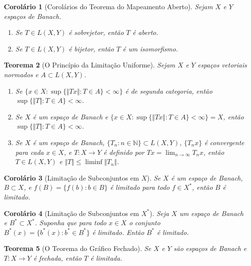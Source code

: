 \documentclass[12pt]{article}
\newtheorem{theorem}{Teorema}[section]
\newtheorem{corollary}[theorem]{Corolário}
\begin{document}
\begin{multicols}{3}
\begin{corollary}[Corolários do Teorema do Mapeamento Aberto]
Sejam $X$ e $Y$ espaços de Banach.
\begin{enumerate}[label=(\alph*)]
    \item Se $T \in L(X, Y)$ é sobrejetor, então $T$ é aberto.
    \item Se $T \in L(X, Y)$ é bijetor, então $T$ é um isomorfismo.
\end{enumerate}
\end{corollary}

\begin{theorem}[O Princípio da Limitação Uniforme]
Sejam $X$ e $Y$ espaços vetoriais normados e $A \subset L(X, Y)$.
\begin{enumerate}[label=(\alph*)]
    \item Se $\{x \in X: \sup\{\Vert Tx \Vert : T \in A\} < \infty\}$ é de segunda categoria, então $\sup\{\Vert T \Vert : T \in A\} < \infty$.
    \item Se $X$ é um espaço de Banach e $\{x \in X: \sup\{\Vert Tx \Vert : T \in A\} < \infty\} = X$, então $\sup\{\Vert T \Vert : T \in A\} < \infty$.
    \item Se $X$ é um espaço de Banach, $\{T_n : n \in \mathbb{N}\} \subset L(X, Y)$, $\{T_nx\}$ é convergente para cada $x \in X$, e $T: X \to Y$ é definido por $Tx = \lim_{n \to \infty} T_nx$, então $T \in L(X, Y)$ e $\Vert T \Vert \le \liminf \Vert T_n \Vert$.
\end{enumerate}
\end{theorem}

\begin{corollary}[Limitação de Subconjuntos em $X$]
Se $X$ é um espaço de Banach, $B \subset X$, e $f(B) = \{f(b): b \in B\}$ é limitado para todo $f \in X^*$, então $B$ é limitado.
\end{corollary}

\begin{corollary}[Limitação de Subconjuntos em $X^*$]
Seja $X$ um espaço de Banach e $B^* \subset X^*$. Suponha que para todo $x \in X$ o conjunto $B^*(x) = \{b^*(x): b^* \in B^*\}$ é limitado. Então $B^*$ é limitado.
\end{corollary}

\begin{theorem}[O Teorema do Gráfico Fechado]
Se $X$ e $Y$ são espaços de Banach e $T: X \to Y$ é fechada, então $T$ é limitada.
\end{theorem}
\end{multicols}
\end{document}
